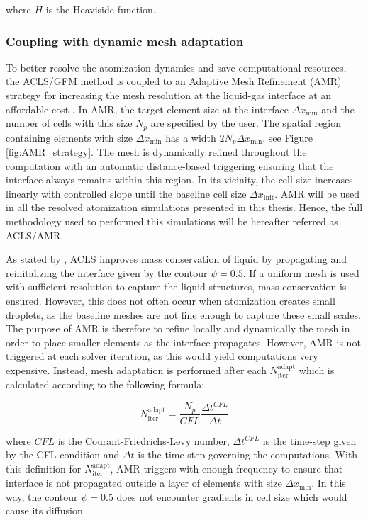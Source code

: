 where $H$ is the Heaviside function.


\subsubsection*{Coupling with dynamic mesh adaptation}

To better resolve the atomization dynamics and save computational resources, the ACLS/GFM method is coupled to an Adaptive Mesh Refinement (AMR) strategy for increasing the mesh resolution at the liquid-gas interface at an affordable cost . In AMR, the target element size at the interface $\Delta x_\mathrm{min}$ and  the number of cells with this size $N_p$ are specified by the user. The spatial region containing elements with size $\Delta x_\mathrm{min}$ has a width $2 N_p\Delta x_\mathrm{min}$, see Figure \ref{fig:AMR_strategy}. The mesh is dynamically refined throughout the computation with an automatic distance-based triggering ensuring that the interface always remains within this region. In its vicinity, the cell size increases linearly with controlled slope until the baseline cell size $\Delta x_\mathrm{init}$. AMR will be used in all the resolved atomization simulations presented in this thesis. Hence, the full methodology used to performed this simulations will be hereafter referred as ACLS/AMR.

As stated by , ACLS improves mass conservation of liquid by propagating and reinitalizing the interface given by the contour $\psi = 0.5$. If a uniform mesh is used with sufficient resolution to capture the liquid structures, mass conservation is ensured. However, this does not often occur when atomization creates small droplets, as the baseline meshes are not fine enough to capture these small scales. The purpose of AMR is therefore to refine locally and dynamically the mesh in order to place smaller elements as the interface propagates. However, AMR is not triggered at each solver iteration, as this would yield computations very expensive. Instead, mesh adaptation is performed after each $N_\mathrm{iter}^\mathrm{adapt}$ which is calculated according to the following formula:

\begin{equation}
\label{eq:ch2_N_iter_adapt_AMR}
N_\mathrm{iter}^\mathrm{adapt} = \frac{N_p}{CFL} \frac{\Delta t^{CFL}}{\Delta t}
\end{equation}

where $CFL$ is the Courant-Friedrichs-Levy number, $\Delta t^{CFL}$ is the time-step given by the CFL condition and $\Delta t$ is the time-step governing the computations.  With this definition for $N_\mathrm{iter}^\mathrm{adapt}$, AMR triggers with enough frequency to ensure that interface is not propagated outside a layer of elements with size $\Delta x_\mathrm{min}$. In this way, the contour $\psi = 0.5$ does not encounter gradients in cell size which would cause its diffusion.

